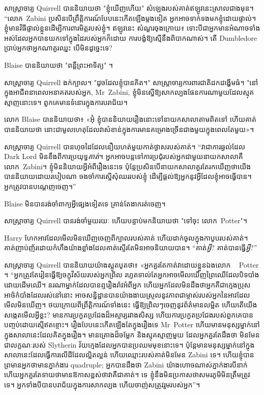 សាស្ត្រាចារ្យ Quirrell បាននិយាយថា "ខ្ញុំឃើញហើយ" សំឡេងរបស់គាត់ឥឡូវនេះស្រាលជាងមុន។ “លោក~Zabini ប្រសិនបើព្រឹត្តិការណ៍បែបនេះកើតឡើងម្តងទៀត អ្នកអាចទាក់ទងមកខ្ញុំដោយផ្ទាល់។ ខ្ញុំមានវិធីផ្ទាល់ខ្លួនដើម្បីការពារមិត្តរបស់ខ្ញុំ។ ឥឡូវនេះ សំណួរចុងក្រោយ៖ ទោះបីជាអ្នកមានអំណាចទាំងអស់ដែលអ្នកបានយកទៅក្នុងដៃរបស់អ្នកក៏ដោយ ការបង្ខំឱ្យស្មើនឹងពិបាកណាស់។ តើ Dumbledore ប្រាប់អ្នកថាអ្នកណាគួរឈ្នះ បើមិនដូច្នេះទេ?

Blaise បាននិយាយថា "ពន្លឺព្រះអាទិត្យ" ។

សាស្ត្រាចារ្យ Quirrell ងក់ក្បាល។ "ដូចដែលខ្ញុំបានគិត។" សាស្ត្រាចារ្យការពារជាតិដកដង្ហើមធំ។ "នៅក្នុងអាជីពនាពេលអនាគតរបស់អ្នក, Mr~Zabini, ខ្ញុំមិនស្នើឱ្យសាកល្បងផែនការណាមួយដែលស្មុគស្មាញនោះទេ។ ពួកគេមានទំនោរក្នុងការបរាជ័យ។

លោក Blaise បាន​និយាយ​ថា​៖ «​អ៊ុំ ខ្ញុំ​បាន​និយាយ​រឿង​នោះ​ទៅ​នាយក​សាលា​តាម​ពិត​ទៅ ហើយ​គាត់​បាន​និយាយ​ថា នោះ​ជា​មូលហេតុ​ដែល​វា​សំខាន់​ក្នុង​ការ​មាន​គម្រោង​ច្រើន​ជាង​មួយ​ក្នុង​ពេល​តែ​មួយ»។

សាស្ត្រាចារ្យ Quirrell បានហុចដៃដែលនឿយហត់មួយកាត់ថ្ងាសរបស់គាត់។ “វាជាការឆ្ងល់ដែល Dark Lord មិនខឹងពីការប្រយុទ្ធ\emph{គាត់}។ អ្នកអាចបន្តទៅការប្រជុំរបស់អ្នកជាមួយនាយកសាលាគឺលោក~Zabini។ ខ្ញុំមិននិយាយអ្វីអំពីរឿងនេះទេ ប៉ុន្តែប្រសិនបើនាយកសាលាគួរតែរកឃើញថាយើងបាននិយាយដោយរបៀបណា ចងចាំការស្នើសុំឈររបស់ខ្ញុំ ដើម្បីផ្តល់ឱ្យអ្នកនូវអ្វីដែលខ្ញុំអាចធ្វើបាន។ អ្នកត្រូវបានបណ្តេញចេញ។”

Blaise មិន​បាន​រង់​ចាំ​ពាក្យ​អ្វី​ផ្សេង​ទៀត​ទេ គ្រាន់​តែ​ងាក​រត់​ចេញ។

\later

សាស្ត្រាចារ្យ Quirrell បានរង់ចាំមួយរយៈ ហើយបន្ទាប់មកនិយាយថា "ទៅចុះ លោក~Potter"។

Harry ហែកអាវដែលមើលមិនឃើញចេញពីក្បាលរបស់គាត់ ហើយដាក់ចូលក្នុងកាបូបរបស់គាត់។ គាត់ញាប់ញ័រដោយកំហឹងយ៉ាងខ្លាំងដែលគាត់ស្ទើរតែមិនអាចនិយាយបាន។ “គាត់\emph{អ្វី}? គាត់បានធ្វើ\emph{អ្វី}?”

សាស្ត្រាចារ្យ Quirrell បាន​និយាយ​យ៉ាង​ស្លូតបូត​ថា​៖ «​អ្នក​គួរតែ​កាត់​វា​ដោយ​ខ្លួន​ឯង​លោក ~ Potter ។ “អ្នកត្រូវតែរៀនធ្វើឱ្យចក្ខុវិស័យរបស់អ្នកព្រិល រហូតទាល់តែអ្នកអាចមើលឃើញព្រៃឈើដែលបិទបាំងដោយដើមឈើ។ នរណាម្នាក់ដែលបានឮរឿងរ៉ាវអំពីអ្នក ហើយអ្នកដែលមិនដឹងថាអ្នកគឺជាក្មេងប្រុសអាថ៌កំបាំងដែលរស់នៅនោះ អាចសន្និដ្ឋានបានយ៉ាងងាយស្រួលនូវភាពជាម្ចាស់របស់អ្នកនៃអាវដែលមើលមិនឃើញ។ ថយក្រោយពីព្រឹត្តិការណ៍ទាំងនេះ ធ្វើឱ្យព្រិលៗចេញនូវព័ត៌មានលម្អិត ហើយតើយើងសង្កេតមើលអ្វីខ្លះ? មានការប្រកួតប្រជែងដ៏អស្ចារ្យរវាងសិស្ស ហើយការប្រកួតប្រជែងរបស់ពួកគេបានបញ្ចប់ដោយស្មើឥតខ្ចោះ។ រឿងបែបនេះកើតឡើងតែក្នុងរឿងទេ Mr~Potter ហើយមានមនុស្សម្នាក់នៅក្នុងសាលានេះដែលគិតក្នុងរឿង។ មានគ្រោងដ៏ចម្លែក និងស្មុគស្មាញមួយ ដែលអ្នកគួរតែដឹងថា មិនមែនជាលក្ខណៈរបស់ Slytherin វ័យក្មេងដែលអ្នកបានប្រឈមមុខនោះទេ។ ប៉ុន្តែ​មាន​មនុស្ស​ម្នាក់​នៅ​ក្នុង​សាលា​នេះ​ដែល​ធ្វើ​ការ​លើ​ដី​ដែល​ល្អិតល្អន់ ហើយ​ឈ្មោះ​របស់​គាត់​មិន​មែន Zabini ទេ។ ហើយខ្ញុំបានព្រមានអ្នកថាមានភ្នាក់ងារ quadruple; អ្នកបានដឹងថា Zabini យ៉ាងហោចណាស់ភ្នាក់ងារបីនាក់ ហើយអ្នកគួរតែទាយថាមានឱកាសខ្ពស់ថាវាគឺជាគាត់។ ទេ ខ្ញុំនឹងមិនប្រកាសថាសមរភូមិមិនត្រឹមត្រូវទេ។ អ្នកទាំងបីបានបរាជ័យក្នុងការសាកល្បង ហើយចាញ់សត្រូវរួមរបស់អ្នក”។

